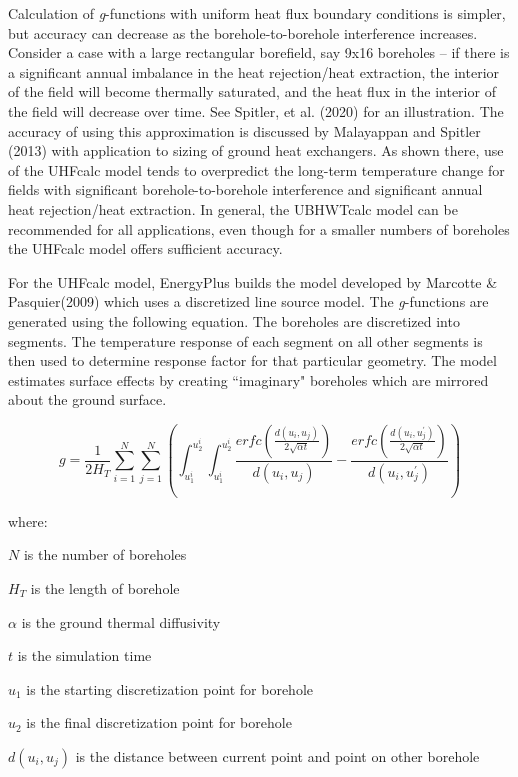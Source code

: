 Calculation of \emph{g}-functions with uniform heat flux boundary conditions is simpler, but accuracy can decrease as the borehole-to-borehole interference increases. Consider a case with a large rectangular borefield, say 9x16 boreholes – if there is a significant annual imbalance in the heat rejection/heat extraction, the interior of the field will become thermally saturated, and the heat flux in the interior of the field will decrease over time. See Spitler, et al. (2020) for an illustration. The accuracy of using this approximation is discussed by Malayappan and Spitler (2013) with application to sizing of ground heat exchangers. As shown there, use of the UHFcalc model tends to overpredict the long-term temperature change for fields with significant borehole-to-borehole interference and significant annual heat rejection/heat extraction. In general, the UBHWTcalc model can be recommended for all applications, even though for a smaller numbers of boreholes the UHFcalc model offers sufficient accuracy.

For the UHFcalc model, EnergyPlus builds the model developed by Marcotte \& Pasquier(2009) which uses a discretized line source model. The \emph{g}-functions are generated using the following equation. The boreholes are discretized into segments. The temperature response of each segment on all other segments is then used to determine response factor for that particular geometry. The model estimates surface effects by creating ``imaginary" boreholes which are mirrored about the ground surface.

\begin{equation}
g = \frac{1}{2 H_T} \sum_{i=1}^N \sum_{j=1}^N \left( \int_{u_1^i}^{u_2^i} \int_{u_1^i}^{u_2^i} \frac{erfc\left( \frac{d(u_i, u_j)}{2\sqrt{\alpha t}}\right)}{d(u_i, u_j)} - \frac{erfc\left( \frac{d(u_i, u_j^{'})}{2\sqrt{\alpha t}}\right)}{d(u_i, u_j^{'})}\right)
\end{equation}

where:

\(N\) is the number of boreholes

\(H_T\) is the length of borehole

\(\alpha\) is the ground thermal diffusivity

\(t\) is the simulation time

\(u_1\) is the starting discretization point for borehole

\(u_2\) is the final discretization point for borehole

\(d(u_i, u_j)\) is the distance between current point and point on other borehole

